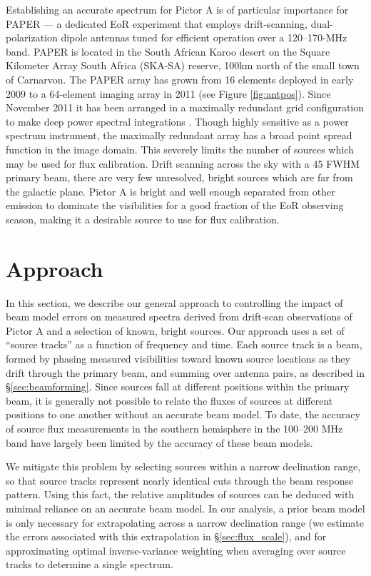 \documentclass[preprint]{aastex}
\begin{document}

Establishing an accurate spectrum for Pictor A is of particular importance for
PAPER --- a dedicated EoR experiment 
that employs drift-scanning, dual-polarization dipole antennas 
tuned for efficient operation over a 120--170-MHz band.  PAPER is located in the South African Karoo desert
on the Square Kilometer Array
South Africa (SKA-SA) reserve, 100km north of the small town of Carnarvon.
The PAPER array has grown from 16 elements deployed in early 2009 to a
64-element imaging array in 2011 (see Figure \ref{fig:antpos}). 
Since November 2011 it has been arranged in a maximally redundant grid 
configuration to make deep power spectral integrations \citep{Parsons:2012p9028}.
Though highly sensitive as a power spectrum instrument, the maximally redundant array 
has a broad point spread function in the image domain. This severely limits the number 
of sources which may be used for flux calibration. Drift scanning across the sky with a 45\arcdeg{} FWHM
primary beam, there are very few unresolved, bright sources which are far from the galactic plane. 
Pictor A is bright and well enough separated from other emission to dominate the visibilities for a good fraction of
the EoR observing season, making it a desirable source to use for flux calibration.

\section{Approach}
\label{sec:approach}
In this section, we describe our general approach to controlling the impact of beam model errors on measured
spectra derived from 
drift-scan observations 
of Pictor A and a selection of known, bright sources.  Our approach uses a set of ``source tracks'' as
a function of frequency and time.  Each source track is a beam, formed by phasing measured visibilities toward
known source locations as they drift through the primary beam, and summing over antenna pairs, as
described in \S\ref{sec:beamforming}.  Since sources fall
at different positions
within the primary beam, it is generally not possible to relate the fluxes of sources at different positions to
one another without an accurate beam model.  To date, the accuracy of source flux measurements in the
southern hemisphere in the 100--200 MHz band have largely been limited by the accuracy of these beam models.

We mitigate this problem by selecting sources within a narrow declination range, so that source tracks represent
nearly identical cuts through the beam response pattern.  Using this fact, the relative amplitudes of sources
can be deduced with minimal reliance on an accurate beam model.  In our analysis, a prior beam model is only
necessary for extrapolating across a narrow declination range (we estimate the errors associated with this 
extrapolation in \S\ref{sec:flux_scale}), and for approximating optimal inverse-variance weighting when averaging
over source tracks to determine a single spectrum.
\end{document}
